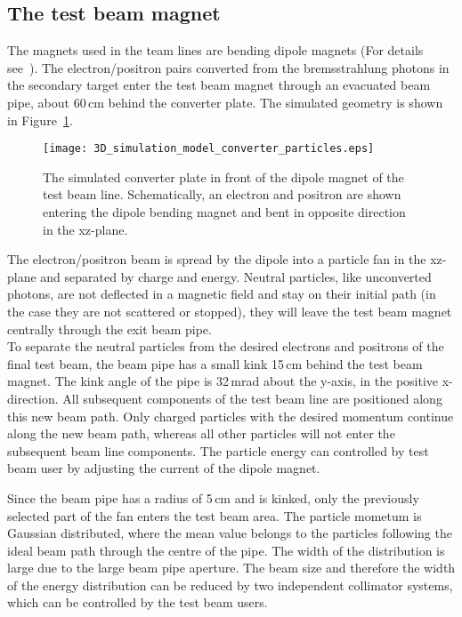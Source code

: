 \subsection{The test beam magnet}

The magnets used in the team lines are bending dipole magnets (For details 
see~\cite{DESY_TB_magnet_MR}). 
The electron/positron pairs converted from the bremsstrahlung photons in the 
secondary target enter the test beam magnet through an evacuated beam pipe, 
about 60\,cm behind the converter plate. The simulated geometry is shown in Figure~\ref{fig:3D_model_converter}.

\begin{figure}[ht]
  \centering
  \texttt{[image: 3D\_simulation\_model\_converter\_particles.eps]}
  \caption[3D simulation model of a converter plate in front of the dipole magnet.]{The simulated converter plate in front of the dipole magnet of the test beam line. Schematically, an electron and positron are shown  entering the dipole bending magnet and bent in opposite direction in the xz-plane.}
    \label{fig:3D_model_converter}
\end{figure}

The electron/positron beam is spread by the dipole into a particle fan in the xz-plane 
and separated by charge and energy. Neutral particles, like unconverted photons, 
 are not deflected in a magnetic field and stay on their 
initial path (in the case they are not scattered or stopped), they will leave 
the test beam magnet centrally through the exit beam pipe.\\
To separate the neutral particles from the desired electrons and positrons of 
the final test beam, the beam pipe has a small kink 15\,cm behind the test beam 
magnet. The kink angle of the pipe is 32\,mrad about the y-axis, in the positive 
x-direction. All subsequent components of the test beam line are positioned 
along this new beam path. Only charged particles with the desired momentum continue 
along the new beam path, whereas all other particles will not enter the 
subsequent beam line components. 
The particle energy can controlled by test beam user by adjusting the current of the dipole magnet.

Since the beam pipe has a radius of 5\,cm and is kinked, only the previously selected part of 
the fan enters the test beam area. The particle mometum is Gaussian distributed, where the mean 
value belongs to the particles following the ideal beam path through the centre 
of the pipe. The width of the distribution is large due to the large beam pipe aperture.
The beam size and therefore the width of the energy distribution can be reduced by two independent collimator systems, 
which can be controlled by the test beam users.
 

